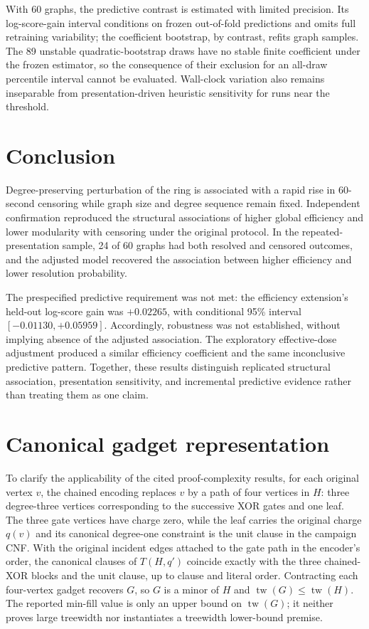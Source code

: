 \documentclass[11pt]{article}
\begin{document}
With 60 graphs, the predictive contrast is estimated with limited precision. Its log-score-gain interval conditions on frozen out-of-fold predictions and omits full retraining variability; the coefficient bootstrap, by contrast, refits graph samples. The 89 unstable quadratic-bootstrap draws have no stable finite coefficient under the frozen estimator, so the consequence of their exclusion for an all-draw percentile interval cannot be evaluated. Wall-clock variation also remains inseparable from presentation-driven heuristic sensitivity for runs near the threshold.

\section{Conclusion}

Degree-preserving perturbation of the ring is associated with a rapid rise in 60-second censoring while graph size and degree sequence remain fixed. Independent confirmation reproduced the structural associations of higher global efficiency and lower modularity with censoring under the original protocol. In the repeated-presentation sample, 24 of 60 graphs had both resolved and censored outcomes, and the adjusted model recovered the association between higher efficiency and lower resolution probability.

The prespecified predictive requirement was not met: the efficiency extension's held-out log-score gain was $+0.02265$, with conditional 95\% interval $[-0.01130,+0.05959]$. Accordingly, robustness was not established, without implying absence of the adjusted association. The exploratory effective-dose adjustment produced a similar efficiency coefficient and the same inconclusive predictive pattern. Together, these results distinguish replicated structural association, presentation sensitivity, and incremental predictive evidence rather than treating them as one claim.

\appendix
\section{Canonical gadget representation}
\label{app:gadget}

To clarify the applicability of the cited proof-complexity results, for each original vertex $v$, the chained encoding replaces $v$ by a path of four vertices in $H$: three degree-three vertices corresponding to the successive XOR gates and one leaf. The three gate vertices have charge zero, while the leaf carries the original charge $q(v)$ and its canonical degree-one constraint is the unit clause in the campaign CNF. With the original incident edges attached to the gate path in the encoder's order, the canonical clauses of $T(H,q')$ coincide exactly with the three chained-XOR blocks and the unit clause, up to clause and literal order. Contracting each four-vertex gadget recovers $G$, so $G$ is a minor of $H$ and $\operatorname{tw}(G)\leq\operatorname{tw}(H)$. The reported min-fill value is only an upper bound on $\operatorname{tw}(G)$; it neither proves large treewidth nor instantiates a treewidth lower-bound premise.
\end{document}
